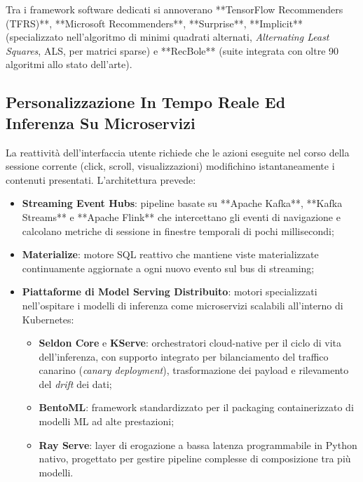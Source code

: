 \documentclass[11pt, a4paper]{article}
\begin{document}
Tra i framework software dedicati si annoverano **TensorFlow Recommenders (TFRS)**, **Microsoft Recommenders**, **Surprise**, **Implicit** (specializzato nell'algoritmo di minimi quadrati alternati, \emph{Alternating Least Squares}, ALS, per matrici sparse) e **RecBole** (suite integrata con oltre 90 algoritmi allo stato dell'arte).


\subsection{Personalizzazione In Tempo Reale Ed Inferenza Su Microservizi}

La reattività dell'interfaccia utente richiede che le azioni eseguite nel corso della sessione corrente (click, scroll, visualizzazioni) modifichino istantaneamente i contenuti presentati. L'architettura prevede:
\begin{itemize}
    \item \textbf{Streaming Event Hubs}: pipeline basate su **Apache Kafka**, **Kafka Streams** e **Apache Flink** che intercettano gli eventi di navigazione e calcolano metriche di sessione in finestre temporali di pochi millisecondi;
    \item \textbf{Materialize}: motore SQL reattivo che mantiene viste materializzate continuamente aggiornate a ogni nuovo evento sul bus di streaming;
    \item \textbf{Piattaforme di Model Serving Distribuito}: motori specializzati nell'ospitare i modelli di inferenza come microservizi scalabili all'interno di Kubernetes:
    \begin{itemize}
        \item \textbf{Seldon Core} e \textbf{KServe}: orchestratori cloud-native per il ciclo di vita dell'inferenza, con supporto integrato per bilanciamento del traffico canarino (\emph{canary deployment}), trasformazione dei payload e rilevamento del \emph{drift} dei dati;
        \item \textbf{BentoML}: framework standardizzato per il packaging containerizzato di modelli ML ad alte prestazioni;
        \item \textbf{Ray Serve}: layer di erogazione a bassa latenza programmabile in Python nativo, progettato per gestire pipeline complesse di composizione tra più modelli.
    \end{itemize}
\end{itemize}
\end{document}

